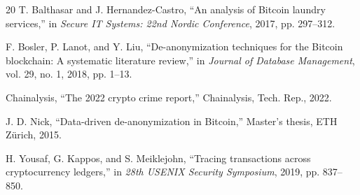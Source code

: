 \documentclass[conference]{IEEEtran}
\begin{document}
\begin{thebibliography}{20}
T. Balthasar and J. Hernandez-Castro, ``An analysis of Bitcoin laundry services,'' in \emph{Secure IT Systems: 22nd Nordic Conference}, 2017, pp. 297--312.

F. Bosler, P. Lanot, and Y. Liu, ``De-anonymization techniques for the Bitcoin blockchain: A systematic literature review,'' in \emph{Journal of Database Management}, vol. 29, no. 1, 2018, pp. 1--13.

Chainalysis, ``The 2022 crypto crime report,'' Chainalysis, Tech. Rep., 2022.

J. D. Nick, ``Data-driven de-anonymization in Bitcoin,'' Master's thesis, ETH Zürich, 2015.

H. Yousaf, G. Kappos, and S. Meiklejohn, ``Tracing transactions across cryptocurrency ledgers,'' in \emph{28th USENIX Security Symposium}, 2019, pp. 837--850.

\end{thebibliography}
\end{document}
